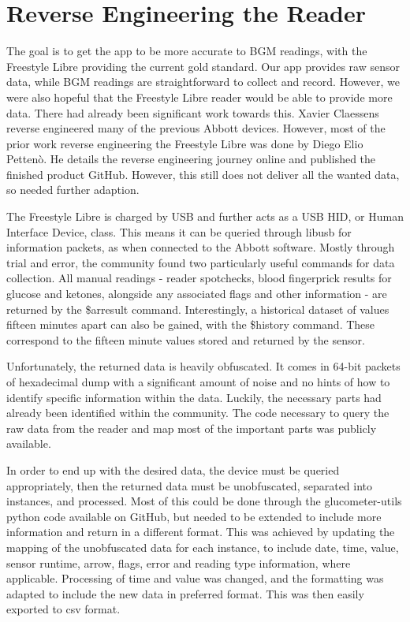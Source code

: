 \section{Reverse Engineering the Reader}
The goal is to get the app to be more accurate to BGM readings, with the Freestyle Libre providing the current gold standard. Our app provides raw sensor data, while BGM readings are straightforward to collect and record. However, we were also hopeful that the Freestyle Libre reader would be able to provide more data.  There had already been significant work towards this. Xavier Claessens reverse engineered many of the previous Abbott devices\cite{claessens_openglucose_2018}. However, most of the prior work reverse engineering the Freestyle Libre was done by Diego Elio Pettenò. He details the reverse engineering journey online\cite{petteno_reverse_2016} and published the finished product GitHub\cite{petteno_glucometer-protocols:_2017}. However, this still does not deliver all the wanted data, so needed further adaption.

The Freestyle Libre is charged by USB and further acts as a USB HID, or Human Interface Device, class. This means it can be queried through libusb for information packets, as when connected to the Abbott software. Mostly through trial and error, the community found two particularly useful commands for data collection. All manual readings - reader spotchecks, blood fingerprick results for glucose and ketones, alongside any associated flags and other information - are returned by the \$arresult command. Interestingly, a historical dataset of values fifteen minutes apart can also be gained, with the \$history command. These correspond to the fifteen minute values stored and returned by the sensor.

Unfortunately, the returned data is heavily obfuscated. It comes in 64-bit packets of hexadecimal dump with a significant amount of noise and no hints of how to identify specific information within the data. Luckily, the necessary parts had already been identified within the community. The code necessary to query the raw data from the reader and map most of the important parts was publicly available\cite{petteno_glucometer-protocols:_2017}. 

In order to end up with the desired data, the device must be queried appropriately, then the returned data must be unobfuscated, separated into instances, and processed. Most of this could be done through the glucometer-utils python code available on GitHub, but needed to be extended to include more information and return in a different format. This was achieved by updating the mapping of the unobfuscated data for each instance, to include date, time, value, sensor runtime, arrow, flags, error and reading type information, where applicable. Processing of time and value was changed, and the formatting was adapted to include the new data in preferred format. This was then easily exported to csv format. 